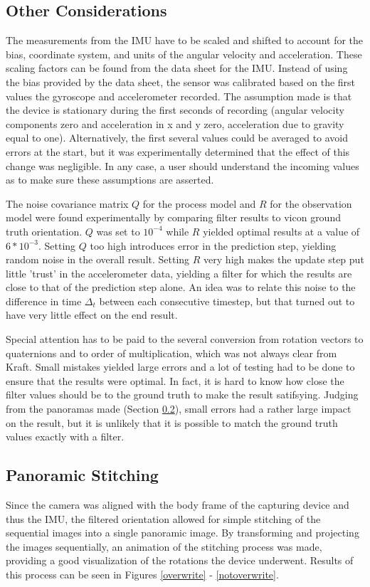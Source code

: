 \documentclass[letterpaper, 10 pt, conference]{ieeeconf}  %
\begin{document}
\subsection{Other Considerations} \label{other}
The measurements from the IMU have to be scaled and shifted to account for the bias, coordinate system, and units of the angular velocity and acceleration. These scaling factors can be found from the data sheet for the IMU. Instead of using the bias provided by the data sheet, the sensor was calibrated based on the first values the gyroscope and accelerometer recorded. The assumption made is that the device is stationary during the first seconds of recording (angular velocity components zero and acceleration in x and y zero, acceleration due to gravity equal to one). Alternatively, the first several values could be averaged to avoid errors at the start, but it was experimentally determined that the effect of this change was negligible. In any case, a user should understand the incoming values as to make sure these assumptions are asserted.

The noise covariance matrix $Q$ for the process model and $R$ for the observation model were found experimentally by comparing filter results to vicon ground truth orientation. $Q$ was set to $10^{-4}$ while $R$ yielded optimal results at a value  of $6*10^{-3}$. Setting $Q$ too high introduces error in the prediction step, yielding random noise in the overall result. Setting $R$ very high makes the update step put little 'trust' in the accelerometer data, yielding a filter for which the results are close to that of the prediction step alone. An idea was to relate this noise to the difference in time $\Delta_t$ between each consecutive timestep, but that turned out to have very little effect on the end result.

Special attention has to be paid to the several conversion from rotation vectors to quaternions and to order of multiplication, which was not always clear from Kraft. Small mistakes yielded large errors and a lot of testing had to be done to ensure that the results were optimal. In fact, it is hard to know how close the filter values should be to the ground truth to make the result satifsying. Judging from the panoramas made (Section \ref{panosection}), small errors had a rather large impact on the result, but it is unlikely that it is possible to match the ground truth values exactly with a filter.

\subsection{Panoramic Stitching} \label{panosection}
Since the camera was aligned with the body frame of the capturing device and thus the IMU, the filtered orientation allowed for simple stitching of the sequential images into a single panoramic image. By transforming and projecting the images sequentially, an animation of the stitching process was made, providing a good visualization of the rotations the device underwent. Results of this process can be seen in Figures \ref{overwrite} - \ref{notoverwrite}.
\end{document}
